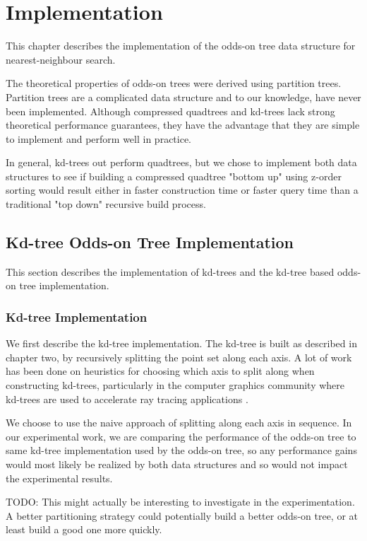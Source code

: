 \documentclass[mcs]{scsthesis}
\begin{document}
\chapter{Implementation}

This chapter describes the implementation of the odds-on tree data structure
for nearest-neighbour search.

The theoretical properties of odds-on trees were derived using partition trees.
Partition trees are a complicated data structure and to our knowledge, have
never been implemented. Although compressed quadtrees and kd-trees lack strong
theoretical performance guarantees, they have the advantage that they are
simple to implement and perform well in practice.

In general, kd-trees out perform quadtrees, but we chose to implement both data
structures to see if building a compressed quadtree "bottom up" using z-order
sorting would result either in faster construction time or faster query time
than a traditional "top down" recursive build process.

\section{Kd-tree Odds-on Tree Implementation}

This section describes the implementation of kd-trees and the kd-tree based
odds-on tree implementation.

\subsection{Kd-tree Implementation}

We first describe the kd-tree implementation. The kd-tree is built as described
in chapter two, by recursively splitting the point set along each axis.  A lot
of work has been done on heuristics for choosing which axis to split along when
constructing kd-trees, particularly in the computer graphics community where
kd-trees are used to accelerate ray tracing applications
\cite{physicallybasedrendering}.

We choose to use the naive approach of splitting along each axis in sequence.
In our experimental work, we are comparing the performance of the odds-on tree
to same kd-tree implementation used by the odds-on tree, so any performance
gains would most likely be realized by both data structures and so would not
impact the experimental results.

TODO: This might actually be interesting to investigate in the experimentation.
A better partitioning strategy could potentially build a better odds-on tree,
or at least build a good one more quickly.
\end{document}
